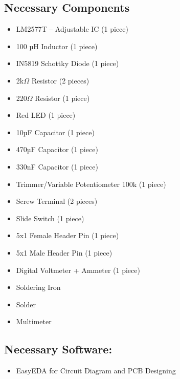 \documentclass[12pt]{article}
\begin{document}
\subsection*{Necessary Components}
\begin{itemize}
    \item LM2577T – Adjustable IC (1 piece)
    \item 100 µH Inductor (1 piece)
    \item IN5819 Schottky Diode (1 piece)
    \item 2k$\Omega$ Resistor (2 pieces)
    \item 220$\Omega$ Resistor (1 piece)
    \item Red LED (1 piece)
    \item 10µF Capacitor (1 piece)
    \item 470µF Capacitor (1 piece)
    \item 330nF Capacitor (1 piece)
    \item Trimmer/Variable Potentiometer 100k (1 piece)
    \item Screw Terminal (2 pieces)
    \item Slide Switch (1 piece)
    \item 5x1 Female Header Pin (1 piece)
    \item 5x1 Male Header Pin (1 piece)
    \item Digital Voltmeter + Ammeter (1 piece)
    \item Soldering Iron
    \item Solder
    \item Multimeter
\end{itemize}
\subsection*{Necessary Software:}
\begin{itemize}
    \item EasyEDA for Circuit Diagram and PCB Designing
\end{itemize}
\end{document}
